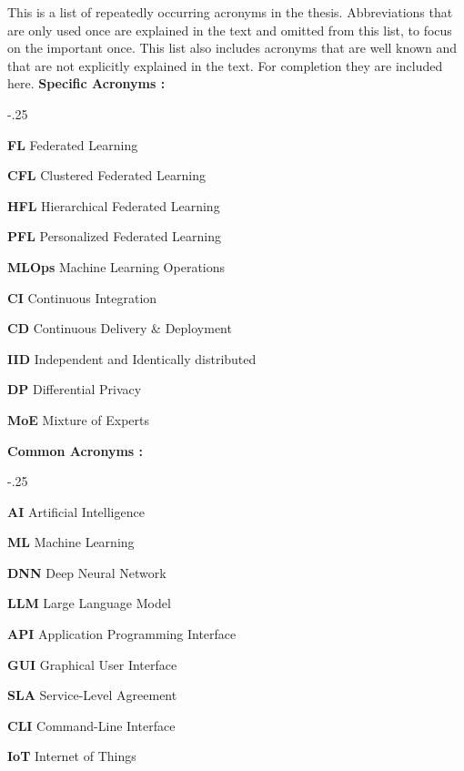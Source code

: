This is a list of repeatedly occurring acronyms in the thesis.
Abbreviations that are only used once are explained in the text and omitted from this list,
to focus on the important once.
This list also includes acronyms that are well known and that are not explicitly explained in the text.
For completion they are included here.
\vspace{5mm}
\newline
\textbf{Specific Acronyms :}
\begin{acronym}
    \itemsep-.25\baselineskip
    \item[\textbf{FL}] Federated Learning 
    \item[\textbf{CFL}] Clustered Federated Learning 
    \item[\textbf{HFL}] Hierarchical Federated Learning 
    \item[\textbf{PFL}] Personalized Federated Learning 
    \item[\textbf{MLOps}] Machine Learning Operations
    \item[\textbf{CI}] Continuous Integration
    \item[\textbf{CD}] Continuous Delivery \& Deployment
    \item[\textbf{IID}] Independent and Identically distributed
    \item[\textbf{DP}] Differential Privacy 
    \item[\textbf{MoE}] Mixture of Experts
\end{acronym}
\textbf{Common Acronyms :}
\begin{acronym}
    \itemsep-.25\baselineskip
    \item[\textbf{AI}] Artificial Intelligence
    \item[\textbf{ML}] Machine Learning
    \item[\textbf{DNN}] Deep Neural Network
    \item[\textbf{LLM}] Large Language Model
    \item[\textbf{API}] Application Programming Interface
    \item[\textbf{GUI}] Graphical User Interface
    \item[\textbf{SLA}] Service-Level Agreement
    \item[\textbf{CLI}] Command-Line Interface
    \item[\textbf{IoT}] Internet of Things
\end{acronym}